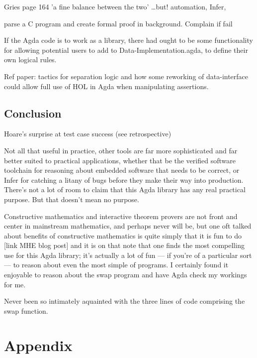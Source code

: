 \documentclass[oneside,12pt]{article}
\begin{document}
Gries page 164 'a fine balance between the two' 
\ldots but! automation, Infer,


parse a C program and create formal proof in background. Complain if fail

If the Agda code is to work as a library, there had ought to be some functionality for allowing potential users to add to Data-Implementation.agda, to define their own logical rules.


Ref paper: tactics for separation logic and how some reworking of data-interface could allow full use of HOL in Agda when manipulating assertions.


\subsection{Conclusion}

Hoare's surprise at test case success (see retrospective)

Not all that useful in practice, other tools are far more sophisticated and far better suited to practical applications, whether that be the verified software toolchain for reasoning about embedded software that needs to be correct, or Infer for catching a litany of bugs before they make their way into production. There's not a lot of room to claim that this Agda library has any real practical purpose. But that doesn't mean no purpose.

Constructive mathematics and interactive theorem provers are not front and center in mainstream mathematics, and perhaps never will be, but one oft talked about benefits of constructive mathematics is quite simply that it is fun to do [link MHE blog post] and it is on that note that one finds the most compelling use for this Agda library; it's actually a lot of fun --- if you're of a particular sort --- to reason about even the most simple of programs. I certainly found it enjoyable to reason about the swap program and have Agda check my workings for me.

Never been so intimately aquainted with the three lines of code comprising the swap function.


\section{Appendix}


\nocite{*}




 
\end{document}

